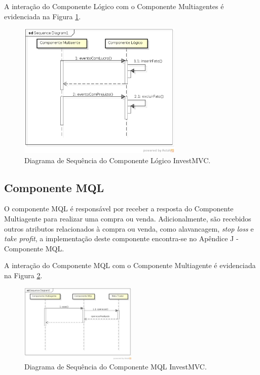A interação do Componente Lógico com o Componente Multiagentes é evidenciada na Figura \ref{sequenciaLogico}.

\begin{figure}[H]
\centering
\includegraphics[width=0.7\textwidth]{figuras/sequenciaLogico}
\caption{Diagrama de Sequência do Componente Lógico InvestMVC.}
\label{sequenciaLogico}
\end{figure}

\subsection{Componente MQL}

O componente MQL é responsável por receber a resposta do Componente Multiagente para realizar uma compra ou venda. Adicionalmente, são recebidos outros atributos relacionados à compra ou venda, como alavancagem, \textit{stop loss} e \textit{take profit}, a implementação deste componente encontra-se no Apêndice J - Componente MQL.

A interação do Componente MQL com o Componente Multiagente é evidenciada na Figura \ref{sequenciaMQL}.

\begin{figure}[H]
\centering
\includegraphics[width=0.5\textwidth]{figuras/sequenciaMQL}
\caption{Diagrama de Sequência do Componente MQL InvestMVC.}
\label{sequenciaMQL}
\end{figure}


